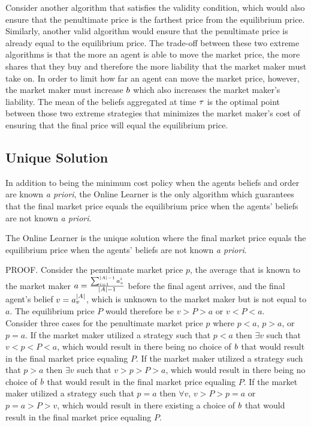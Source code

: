 Consider another algorithm that satisfies the validity condition, which would also ensure that the penultimate price is the farthest price from the equilibrium price. Similarly, another valid algorithm would ensure that the penultimate price is already equal to the equilibrium price. The trade-off between these two extreme algorithms is that the more an agent is able to move the market price, the more shares that they buy and therefore the more liability that the market maker must take on. In order to limit how far an agent can move the market price, however, the market maker must increase $b$ which also increases the market maker's liability. The mean of the beliefs aggregated at time $\tau$ is the optimal point between those two extreme strategies that minimizes the market maker's cost of ensuring that the final price will equal the equilibrium price.\\

\subsection{Unique Solution}
In addition to being the minimum cost policy when the agents beliefs and order are known \emph{a priori}, the Online Learner is the only algorithm which guarantees that the final market price equals the equilibrium price when the agents' beliefs are not known \emph{a priori}. \\

\begin{theorem}
The Online Learner is the unique solution where the final market price equals the equilibrium price when the agents' beliefs are not known \emph{a priori}.
\end{theorem}

PROOF. Consider the penultimate market price $p$, the average that is known to the market maker $a = \frac{\sum_{i=1}^{|A|-1} a^{i}_{v}}{|A|-1}$ before the final agent arrives, and the final agent's belief $v = a^{|A|}_{v}$, which is unknown to the market maker but is not equal to $a$. The equilibrium price $P$ would therefore be $v > P > a$ or $v < P < a$.\\

Consider three cases for the penultimate market price $p$ where $p < a$, $p > a$, or $p = a$. If the market maker utilized a strategy such that $p < a$ then $\exists v$ such that $v < p < P < a$, which would result in there being no choice of $b$ that would result in the final market price equaling $P$. If the market maker utilized a strategy such that $p > a$ then $\exists v$ such that $v > p > P > a$, which would result in there being no choice of $b$ that would result in the final market price equaling $P$. If the market maker utilized a strategy such that $p = a$ then $\forall v$, $v > P > p = a$ or $p = a > P > v$, which would result in there existing a choice of $b$ that would result in the final market price equaling $P$.\\

